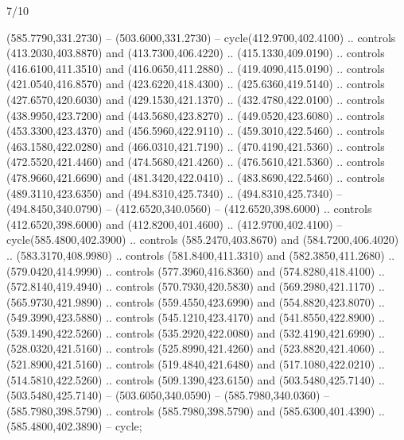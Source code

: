 \begin{flagdescription}{7/10}
\begin{scope}[xshift=0.5\flaglength]
\begin{scope}[scale=0.00185\flagwidth,yshift=245mm,xshift=-43.7mm]
\begin{scope}[y=-0.8pt, x=0.8pt, inner sep=0pt, outer sep=0pt]
\begin{scope}[shift={(-344.0678,183.89831)},draw=brown,line width=0.638\lw]
  (585.7790,331.2730) -- (503.6000,331.2730) -- cycle(412.9700,402.4100) ..
  controls (413.2030,403.8870) and (413.7300,406.4220) .. (415.1330,409.0190) ..
  controls (416.6100,411.3510) and (416.0650,411.2880) .. (419.4090,415.0190) ..
  controls (421.0540,416.8570) and (423.6220,418.4300) .. (425.6360,419.5140) ..
  controls (427.6570,420.6030) and (429.1530,421.1370) .. (432.4780,422.0100) ..
  controls (438.9950,423.7200) and (443.5680,423.8270) .. (449.0520,423.6080) ..
  controls (453.3300,423.4370) and (456.5960,422.9110) .. (459.3010,422.5460) ..
  controls (463.1580,422.0280) and (466.0310,421.7190) .. (470.4190,421.5360) ..
  controls (472.5520,421.4460) and (474.5680,421.4260) .. (476.5610,421.5360) ..
  controls (478.9660,421.6690) and (481.3420,422.0410) .. (483.8690,422.5460) ..
  controls (489.3110,423.6350) and (494.8310,425.7340) .. (494.8310,425.7340) --
  (494.8450,340.0790) -- (412.6520,340.0560) -- (412.6520,398.6000) .. controls
  (412.6520,398.6000) and (412.8200,401.4600) .. (412.9700,402.4100) --
  cycle(585.4800,402.3900) .. controls (585.2470,403.8670) and
  (584.7200,406.4020) .. (583.3170,408.9980) .. controls (581.8400,411.3310) and
  (582.3850,411.2680) .. (579.0420,414.9990) .. controls (577.3960,416.8360) and
  (574.8280,418.4100) .. (572.8140,419.4940) .. controls (570.7930,420.5830) and
  (569.2980,421.1170) .. (565.9730,421.9890) .. controls (559.4550,423.6990) and
  (554.8820,423.8070) .. (549.3990,423.5880) .. controls (545.1210,423.4170) and
  (541.8550,422.8900) .. (539.1490,422.5260) .. controls (535.2920,422.0080) and
  (532.4190,421.6990) .. (528.0320,421.5160) .. controls (525.8990,421.4260) and
  (523.8820,421.4060) .. (521.8900,421.5160) .. controls (519.4840,421.6480) and
  (517.1080,422.0210) .. (514.5810,422.5260) .. controls (509.1390,423.6150) and
  (503.5480,425.7140) .. (503.5480,425.7140) -- (503.6050,340.0590) --
  (585.7980,340.0360) -- (585.7980,398.5790) .. controls (585.7980,398.5790) and
  (585.6300,401.4390) .. (585.4800,402.3890) -- cycle;
\end{scope}
\end{scope}
\end{scope}
\end{scope}
\fi
\framecode{}
\end{flagdescription}
